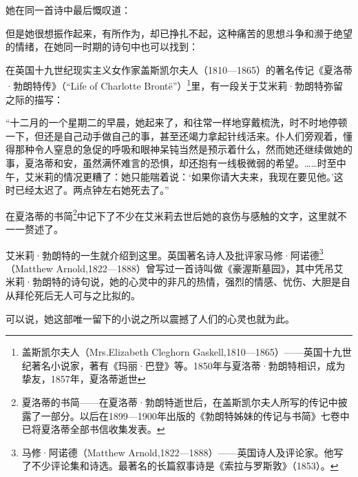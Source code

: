\par 她在同一首诗中最后慨叹道：
\par 但是她很想振作起来，有所作为，却已挣扎不起，这种痛苦的思想斗争和濒于绝望的情绪，在她同一时期的诗句中也可以找到：
\par 在英国十九世纪现实主义女作家盖斯凯尔夫人（1810—1865）的著名传记《夏洛蒂·勃朗特传》（“Life of Charlotte Brontë”）\footnote{盖斯凯尔夫人（Mrs.Elizabeth Cleghorn Gaskell,1810—1865）——英国十九世纪著名小说家，著有《玛丽·巴登》等。1850年与夏洛蒂·勃朗特相识，成为挚友，1857年，夏洛蒂逝世}里，有一段关于艾米莉·勃朗特弥留之际的描写：
\par “十二月的一个星期二的早晨，她起来了，和往常一样地穿戴梳洗，时不时地停顿一下，但还是自己动手做自己的事，甚至还竭力拿起针线活来。仆人们旁观着，懂得那种令人窒息的急促的呼吸和眼神呆钝当然是预示着什么，然而她还继续做她的事，夏洛蒂和安，虽然满怀难言的恐惧，却还抱有一线极微弱的希望。……时至中午，艾米莉的情况更糟了：她只能喘着说：‘如果你请大夫来，我现在要见他。’这时已经太迟了。两点钟左右她死去了。”
\par 在夏洛蒂的书简\footnote{夏洛蒂的书简——在夏洛蒂·勃朗特逝世后，在盖斯凯尔夫人所写的传记中披露了一部分。以后在1899—1900年出版的《勃朗特姊妹的传记与书简》七卷中已将夏洛蒂全部书信收集发表。}中记下了不少在艾米莉去世后她的哀伤与感触的文字，这里就不一一赘述了。
\par 艾米莉·勃朗特的一生就介绍到这里。英国著名诗人及批评家马修·阿诺德\footnote{马修·阿诺德（Matthew Arnold,1822—1888）——英国诗人及评论家。他写了不少评论集和诗选。最著名的长篇叙事诗是《索拉与罗斯敦》（1853）。}（Matthew Arnold,1822—1888）曾写过一首诗叫做《豪渥斯墓园》，其中凭吊艾米莉·勃朗特的诗句说，她的心灵中的非凡的热情，强烈的情感、忧伤、大胆是自从拜伦死后无人可与之比拟的。
\par 可以说，她这部唯一留下的小说之所以震撼了人们的心灵也就为此。
